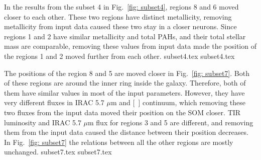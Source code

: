         In the results from the subset 4 in Fig.~\ref{fig: subset4}, regions 8 and 6 moved closer to each other. 
        These two regions have distinct metallicity, removing metallicity from input data caused these two stay in a closer neurons. 
        Since regions 1 and 2 have similar metallicity and total PAHs, and their total stellar mass are comparable, removing these values from input data made the position of the regions 1 and 2 moved further from each other. 
        {subset4.tex}
        {subset4.tex}
        
        The positions of the region 8 and 5 are moved closer in Fig.~\ref{fig: subset7}.
        Both of these regions are around the inner ring inside the galaxy.
        Therefore, both of them have similar values in most of the input parameters.
        However, they have very different fluxes in IRAC 5.7 $\mu$m and [~\sii] continuum, which removing these two fluxes from the input data moved their position on the SOM closer.
        TIR luminosity and IRAC 5.7 $\mu$m flux for regions 3 and 5 are different, and removing them from the input data caused the distance between their position decreases. 
        In Fig.~\ref{fig: subset7} the relations between all the other regions are mostly unchanged.
        {subset7.tex}
        {subset7.tex}
        